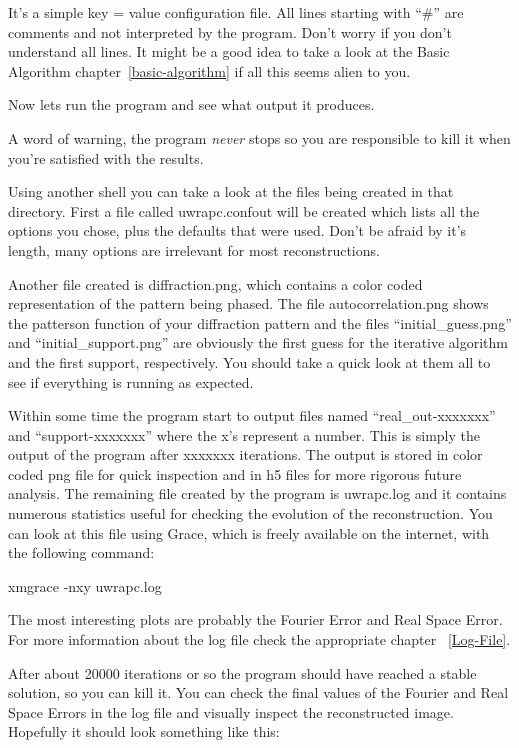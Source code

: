 \documentclass{report}
\begin{document}
It's a simple key = value configuration file. All lines starting with ``\#'' are
comments and not interpreted by the program. Don't worry if you don't understand all lines.
It might be a good idea to take a look at the Basic Algorithm chapter~\ref{basic-algorithm}
if all this seems alien to you. 

Now lets run the program and see what output it produces.


A word of warning, the program {\em never} stops so you are responsible to kill it when you're satisfied
with the results. 

Using another shell you can take a look at the files being created in that directory.
First a file called uwrapc.confout will be created which lists all the options you chose, plus the defaults
that were used. Don't be afraid by it's length, many options are irrelevant for most reconstructions.

Another file created is diffraction.png, which contains a color coded representation of the pattern being
phased. The file autocorrelation.png shows the patterson function of your diffraction pattern and the files
``initial\_guess.png'' and ``initial\_support.png'' are obviously the first guess for the
 iterative algorithm and the
 first support, respectively. You should take a quick look at them all to see if everything is running as
 expected. 

Within some time the program start to output files named ``real\_out-xxxxxxx'' and 
``support-xxxxxxx'' where the x's represent a number. This is simply the output of the program 
after xxxxxxx iterations. The output is stored in color coded png file for quick inspection and in h5
 files for more rigorous future analysis. The remaining file created by the program is uwrapc.log and it
contains numerous statistics useful for checking the evolution of the reconstruction. You can look at 
this file using Grace, which is freely available on the internet, with the following command:

xmgrace -nxy uwrapc.log

The most interesting plots are probably the Fourier Error and Real Space Error. For more information about
 the log file check the appropriate chapter ~\ref{Log-File}.

After about 20000 iterations or so the program should have reached a stable solution, so you can kill it.
You can check the final values of the Fourier and Real Space Errors in the log file and visually inspect the
reconstructed image. Hopefully it should look something like this:
\end{document}
